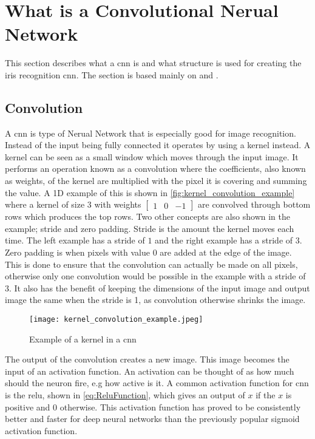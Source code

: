 \section{What is a Convolutional Nerual Network}
\label{sec:cnn_theory}
This section describes what a \gls{cnn} is and what structure is used for creating the iris recognition \gls{cnn}. The section is based mainly on \cite{Karpathy2016a} and \cite{Nielsen2015}.

\subsection{Convolution}
A \gls{cnn} is type of Nerual Network that is especially good for image recognition. Instead of the input being fully connected it operates by using a kernel instead. A kernel can be seen as a small window which moves through the input image. It performs an operation known as a convolution where the coefficients, also known as weights, of the kernel are multiplied with the pixel it is covering and summing the value. A 1D example of this is shown in \autoref{fig:kernel_convolution_example} where a kernel of size 3 with weights $\begin{bmatrix} 1 & 0 & -1 \end{bmatrix}$ are convolved through bottom rows which produces the top rows. Two other concepts are also shown in the example; stride and zero padding. Stride is the amount the kernel moves each time. The left example has a stride of $1$ and the right example has a stride of $3$. Zero padding is when pixels with value $0$ are added at the edge of the image. This is done to ensure that the convolution can actually be made on all pixels, otherwise only one convolution would be possible in the example with a stride of 3. It also has the benefit of keeping the dimensions of the input image and output image the same when the stride is 1, as convolution otherwise shrinks the image. 

\begin{figure}[h]
\centering
\texttt{[image: kernel\_convolution\_example.jpeg]}
\caption{Example of a kernel in a \gls{cnn} \citep{Karpathy2016a}}
\label{fig:kernel_convolution_example}
\end{figure}

The output of the convolution creates a new image. This image becomes the input of an activation function. An activation can be thought of as how much should the neuron fire, e.g how active is it. A common activation function for \gls{cnn} is the \gls{relu}, shown in \autoref{eq:ReluFunction}, which gives an output of $x$ if the $x$ is positive and 0 otherwise. This activation function has proved to be consistently better and faster for deep neural networks than the previously popular sigmoid activation function.

